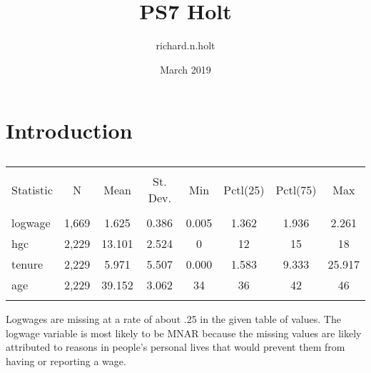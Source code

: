 \documentclass{article}
\title{PS7 Holt}
\author{richard.n.holt }
\date{March 2019}
\begin{document}
\section{Introduction}

\begin{table}[!htbp] \centering 
  \caption{} 
  \label{} 
\begin{tabular}{@{\extracolsep{5pt}}lccccccc} 
\\[-1.8ex]\hline 
\hline \\[-1.8ex] 
Statistic & \multicolumn{1}{c}{N} & \multicolumn{1}{c}{Mean} & \multicolumn{1}{c}{St. Dev.} & \multicolumn{1}{c}{Min} & \multicolumn{1}{c}{Pctl(25)} & \multicolumn{1}{c}{Pctl(75)} & \multicolumn{1}{c}{Max} \\ 
\hline \\[-1.8ex] 
logwage & 1,669 & 1.625 & 0.386 & 0.005 & 1.362 & 1.936 & 2.261 \\ 
hgc & 2,229 & 13.101 & 2.524 & 0 & 12 & 15 & 18 \\ 
tenure & 2,229 & 5.971 & 5.507 & 0.000 & 1.583 & 9.333 & 25.917 \\ 
age & 2,229 & 39.152 & 3.062 & 34 & 36 & 42 & 46 \\ 
\hline \\[-1.8ex] 
\end{tabular} 
\end{table} 

Logwages are missing at a rate of about .25 in the given table of values. The logwage variable is most likely to be MNAR because the missing values are likely attributed to reasons in people's personal lives that would prevent them from having or reporting a wage.
\end{document}
